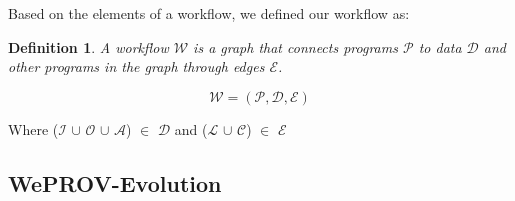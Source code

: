 \documentclass[ao]{iosart2x}
\begin{document}
Based on the elements of a workflow, we defined our workflow as: 

\newtheorem{definition}{Definition}[section]
\begin{definition}\label{def:workflow}
A workflow \begin{math}\mathcal{W}\end{math} is a graph that connects programs \begin{math}\mathcal{P}\end{math} to data \begin{math}\mathcal{D}\end{math} and other programs in the graph through edges \begin{math}\mathcal{E}\end{math}.
\end{definition}
    \begin{equation}
            \mathcal{W} = (\mathcal{P}, \mathcal{D}, \mathcal{E})
    \end{equation}

    Where (\begin{math}\mathcal{I}\end{math} $\cup$ \begin{math}\mathcal{O}\end{math} $\cup$ \begin{math}\mathcal{A}\end{math}) $\in$ \begin{math}\mathcal{D}\end{math}  and (\begin{math}\mathcal{L}\end{math} $\cup$ \begin{math}\mathcal{C}\end{math}) $\in$ \begin{math}\mathcal{E}\end{math} 

\subsection{WePROV-Evolution}
\label{subsec:weprov-evolution}
\end{document}
